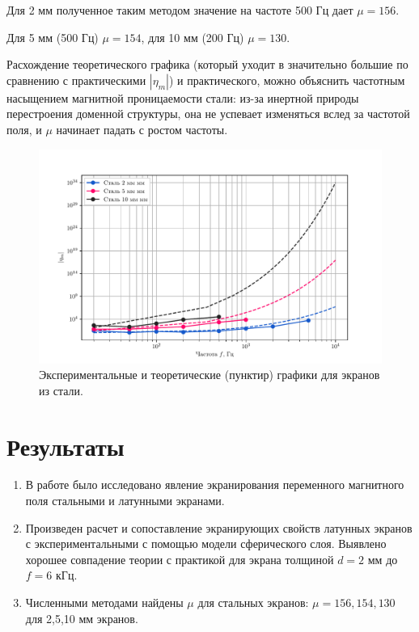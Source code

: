 Для 2 мм полученное таким методом значение на частоте 500 Гц дает $\mu=156$.


Для 5 мм (500 Гц) $\mu=154$, для 10 мм (200 Гц) $\mu=130$.



Расхождение теоретического графика (который уходит в значительно большие по сравнению с практическими $|\eta_m|$)  и
практического, можно объяснить частотным насыщением магнитной проницаемости стали: из-за инертной природы перестроения
доменной структуры, она не успевает изменяться вслед за частотой поля, и $\mu$ начинает падать с ростом частоты.

\begin{figure}[H]
	\vspace{-10pt}
	\centering
	\includegraphics[width=0.95\linewidth]{fig/st}
	\caption{Экспериментальные и теоретические (пунктир) графики для экранов из стали.}
	\label{fig:eta_wt_steel}
\end{figure}
\section{Результаты}
\begin{enumerate}
	\item В работе было исследовано явление экранирования переменного магнитного поля стальными и латунными экранами. 

	\item Произведен расчет и сопоставление экранирующих свойств латунных экранов с экспериментальными с помощью модели сферического слоя. Выявлено хорошее совпадение теории с практикой для экрана толщиной $d=2$ мм до $f=6$ кГц. 

	\item Численными методами найдены $\mu$ для стальных экранов: $\mu=156,154,130$ для 2,5,10 мм экранов. 
\end{enumerate}

